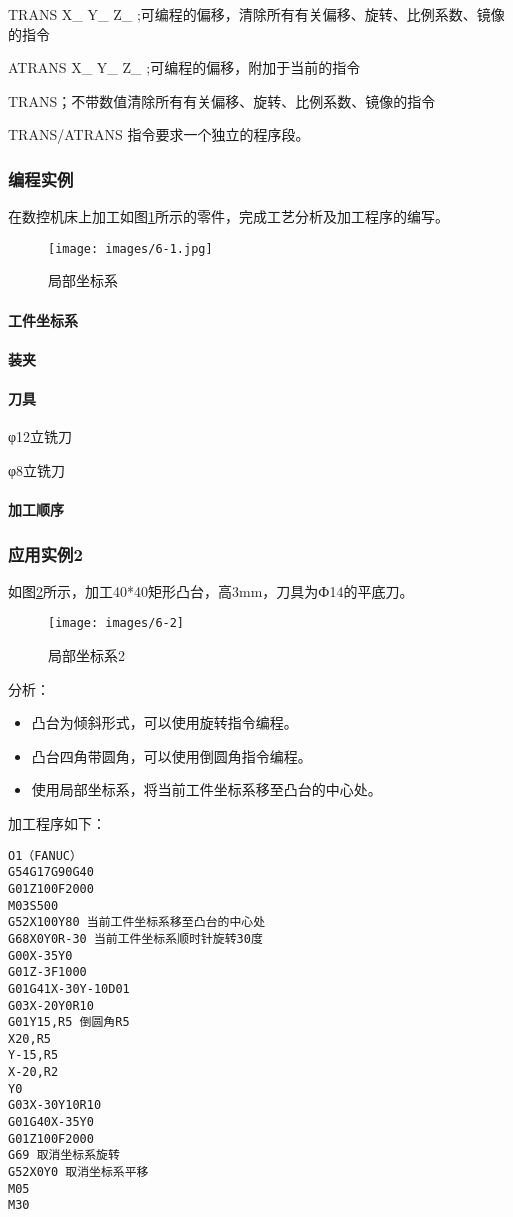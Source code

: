 TRANS X\_ Y\_ Z\_ ;可编程的偏移，清除所有有关偏移、旋转、比例系数、镜像的指令 

ATRANS X\_ Y\_ Z\_ ;可编程的偏移，附加于当前的指令 

TRANS；不带数值清除所有有关偏移、旋转、比例系数、镜像的指令 

TRANS/ATRANS 指令要求一个独立的程序段。

\subsubsection{编程实例}
在数控机床上加工如图\ref{局部坐标系}所示的零件，完成工艺分析及加工程序的编写。

\begin{figure}[!hbtp]
	\centering	\texttt{[image: images/6-1.jpg]}
	\caption{局部坐标系} \label{局部坐标系}
\end{figure}

\paragraph{工件坐标系}
\paragraph{装夹}
\paragraph{刀具}
φ12立铣刀

φ8立铣刀
\paragraph{加工顺序}


\subsubsection{应用实例2}
如图\ref{局部坐标系2}所示，加工40*40矩形凸台，高3mm，刀具为Ф14的平底刀。
\begin{figure}[!hbtp]
	\centering	\texttt{[image: images/6-2]}
	\caption{局部坐标系2} \label{局部坐标系2}
\end{figure}

分析：
\begin{itemize}
\item 凸台为倾斜形式，可以使用旋转指令编程。
\item 凸台四角带圆角，可以使用倒圆角指令编程。
\item 使用局部坐标系，将当前工件坐标系移至凸台的中心处。
\end{itemize}
加工程序如下：
\begin{verbatim}
O1（FANUC）
G54G17G90G40
G01Z100F2000
M03S500
G52X100Y80 当前工件坐标系移至凸台的中心处
G68X0Y0R-30 当前工件坐标系顺时针旋转30度
G00X-35Y0
G01Z-3F1000            
G01G41X-30Y-10D01
G03X-20Y0R10
G01Y15,R5 倒圆角R5
X20,R5
Y-15,R5
X-20,R2
Y0
G03X-30Y10R10
G01G40X-35Y0
G01Z100F2000
G69 取消坐标系旋转
G52X0Y0 取消坐标系平移
M05
M30
\end{verbatim}



